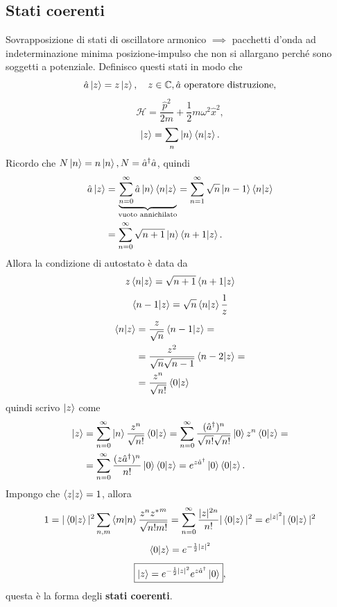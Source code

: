 \subsection{Stati coerenti}
Sovrapposizione di stati di oscillatore armonico \( \implies \) pacchetti d'onda ad indeterminazione minima posizione-impulso che non si allargano perché sono soggetti a potenziale. Definisco questi stati in modo che 
\[
\hat{a} \ket{z} = z \ket{z}, \quad z \in \mathbb{C}, \hat{a} \text{ operatore distruzione},
\]
\[
\mathcal{H} = \frac{\hat{p}^2}{2m} + \frac{1}{2} m\omega^2 \hat{x}^2,
\]
\[
\ket{z} = \sum_n \ket{n}\braket{n|z}.
\]
Ricordo che \( N \ket{n} = n \ket{n}, N = \hat{a}^\dag \hat{a} \), quindi
\begin{align*}
\hat{a} \ket{z} &= \underbrace{\sum_{n = 0}^\infty \hat{a} \ket{n} \braket{n|z}}_{\text{vuoto annichilato}} = \sum_{n = 1}^\infty \sqrt{n} \ket{n - 1} \braket{n|z} \\
&= \sum_{n = 0}^\infty \sqrt{n + 1} \ket{n} \braket{n + 1|z}.
\end{align*}
Allora la condizione di autostato è data da 
\[
z \braket{n|z} = \sqrt{n + 1} \braket{n + 1|z}
\]
\[
\braket{n - 1|z} = \sqrt{n} \braket{n|z} \frac{1}{z}
\]
\begin{align*}
\braket{n|z} &= \frac{z}{\sqrt{n}} \braket{n - 1|z} = \\
&= \frac{z^2}{\sqrt{n}\sqrt{n - 1}} \braket{n - 2|z} = \\
&= \frac{z^n}{\sqrt{n!}} \braket{0|z}
\end{align*}
quindi scrivo \( \ket{z} \) come
\begin{align*}
\ket{z} &= \sum_{n = 0}^\infty \ket{n} \frac{z^n}{\sqrt{n!}} \braket{0|z} = \sum_{n = 0}^\infty \frac{(\hat{a}^\dag)^n}{\sqrt{n!}\sqrt{n!}} \ket{0} z^n \braket{0|z} = \\
&= \sum_{n = 0}^\infty \frac{(z\hat{a}^\dag)^n}{n!} \ket{0} \braket{0|z} = e^{z\hat{a}^\dag} \ket{0} \braket{0|z}.
\end{align*}
Impongo che \( \braket{z|z} = 1 \), allora 
\[
1 = |\braket{0|z}|^2 \sum_{n, m} \braket{m|n} \frac{z^n {z^*}^m}{\sqrt{n!m!}} = \sum_{n = 0}^\infty \frac{|z|^{2n}}{n!} |\braket{0|z}|^2 = e^{|z|^2} |\braket{0|z}|^2
\]
\[
\braket{0|z} = e^{-\frac{1}{2}|z|^2}
\]
\[
\boxed{\ket{z} = e^{-\frac{1}{2}|z|^2} e^{z\hat{a}^\dag} \ket{0}},
\]
questa è la forma degli \textbf{stati coerenti}.

